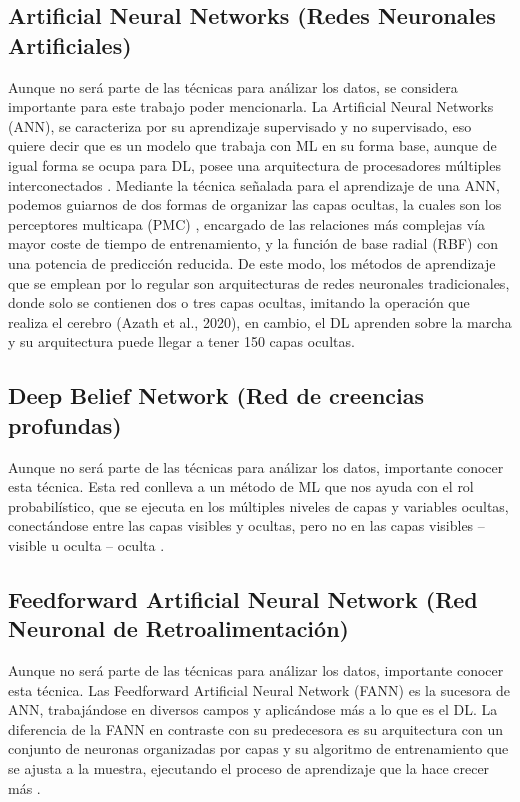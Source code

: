 \doublespacing
\subsection{Artificial Neural Networks (Redes Neuronales Artificiales)}
Aunque no será parte de las técnicas para análizar los datos, se considera importante para este trabajo poder mencionarla. La Artificial Neural Networks (ANN), se caracteriza por su aprendizaje supervisado y no supervisado, eso quiere decir que es un modelo que trabaja con ML en su forma base, aunque de igual forma se ocupa para DL, posee una arquitectura de procesadores múltiples interconectados \cite{salas2004redes}. Mediante la técnica señalada para el aprendizaje de una ANN, podemos guiarnos de dos formas de organizar las capas ocultas, la cuales son los perceptores multicapa (PMC) \cite{Borracci2021}, encargado de las relaciones más complejas vía mayor coste de tiempo de entrenamiento, y la función de base radial (RBF) con una potencia de predicción reducida. De este modo, los métodos de aprendizaje que se emplean por lo regular son arquitecturas de redes neuronales tradicionales, donde solo se contienen dos o tres capas ocultas, imitando la operación que realiza el cerebro (Azath et al., 2020), en cambio, el DL aprenden sobre la marcha y su arquitectura puede llegar a tener 150 capas ocultas. \\

\doublespacing
\subsection{Deep Belief Network (Red de creencias profundas)}
Aunque no será parte de las técnicas para análizar los datos, importante conocer esta técnica. Esta red conlleva a un método de ML que nos ayuda con el rol probabilístico, que se ejecuta en los múltiples niveles de capas y variables ocultas, conectándose entre las capas visibles y ocultas, pero no en las capas visibles – visible u oculta – oculta \cite{PuertaBarrera2015}.\\

\doublespacing
\subsection{Feedforward Artificial Neural Network (Red Neuronal de Retroalimentación)}
Aunque no será parte de las técnicas para análizar los datos, importante conocer esta técnica. Las Feedforward Artificial Neural Network (FANN) es la sucesora de ANN, trabajándose en diversos campos y aplicándose más a lo que es el DL. La diferencia de la FANN en contraste con su predecesora es su arquitectura con un conjunto de neuronas organizadas por capas y su algoritmo de entrenamiento que se ajusta a la muestra, ejecutando el proceso de aprendizaje que la hace crecer más \cite{salas2004redes}.\\

